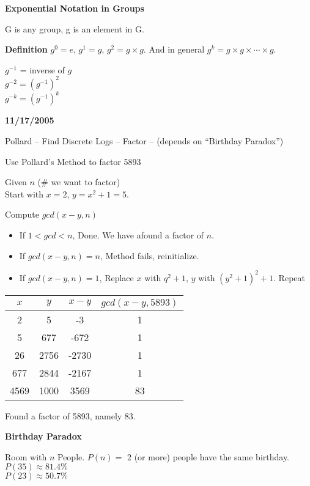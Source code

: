 \textbf{Exponential Notation in Groups}

G is any group, g is an element in G.

\textbf{Definition} $g^0 = e$, $g^1 = g$, $g^2 = g \times g$. And in general $g^k = g \times g \times \cdots \times g$.

$g^{-1}$ = inverse of $g$\\
$g^{-2} = (g^{-1})^2$\\
$g^{-k} = (g^{-1})^k$

\textbf{11/17/2005}

Pollard -- Find Discrete Logs -- Factor -- (depends on ``Birthday Paradox'')

Use Pollard's Method to factor 5893

Given $n$ (\# we want to factor)\\
Start with $x=2$, $y=x^2+1 = 5$.

Compute $gcd(x-y,n)$
\begin{itemize}
	\item[] If $1 < gcd < n$, Done. We have afound a factor of $n$.
	\item[] If $gcd(x-y,n) = n$, Method fails, reinitialize.
	\item[] If $gcd(x-y,n) = 1$, Replace $x$ with $q^2+1$, $y$ with $(y^2+1)^2 + 1$. Repeat
\end{itemize}

\begin{tabular}{|c|c|c|c|}\hline
	$x$ & $y$ & $x-y$ & $gcd(x-y,5893)$ \\ \hline
	2 & 5 & -3 & 1 \\ \hline
	5 & 677 & -672 & 1 \\ \hline
	26 & 2756 & -2730 & 1 \\ \hline
	677 & 2844 & -2167 & 1 \\ \hline
	4569 & 1000 & 3569 & 83 \\ \hline

\end{tabular}

Found a factor of 5893, namely 83.

\textbf{Birthday Paradox}

Room with $n$ People. $P(n) = $ 2 (or more) people have the same birthday. \\
$P(35) \approx 81.4\%$ \\
$P(23) \approx 50.7\%$ 

